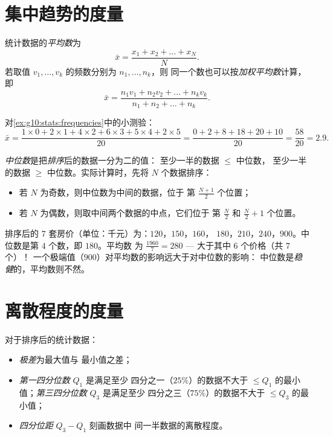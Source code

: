 \section{集中趋势的度量}

\begin{definition}[平均数]\label{def:g10:stats:mean}
统计数据的\emph{平均数}为
\[
\bar x = \frac{x_1 + x_2 + \dots + x_N}{N}.
\]
若取值 $v_1, \dots, v_k$ 的频数分别为 $n_1, \dots, n_k$，则
同一个数也可以按\emph{加权平均数}计算，即
\[
\bar x = \frac{n_1 v_1 + n_2 v_2 + \dots + n_k v_k}{n_1 + n_2 + \dots + n_k}.
\]
\end{definition}

\begin{example}\label{ex:g10:stats:mean}
对\cref{ex:g10:stats:frequencies}中的小测验：
\[
\bar x = \frac{1 \times 0 + 2 \times 1 + 4 \times 2 + 6 \times 3
+ 5 \times 4 + 2 \times 5}{20}
= \frac{0 + 2 + 8 + 18 + 20 + 10}{20}
= \frac{58}{20} = 2.9 .
\]
\end{example}

\begin{definition}[中位数]\label{def:g10:stats:median}
\emph{中位数}是把\emph{排序}后的数据一分为二的值：
至少一半的数据 $\leq$ 中位数，
至少一半的数据 $\geq$ 中位数。实际计算时，先将 $N$ 个数据排序：
\begin{itemize}
  \item 若 $N$ 为奇数，则中位数为中间的数据，位于
        第 $\frac{N+1}{2}$ 个位置；
  \item 若 $N$ 为偶数，则取中间两个数据的中点，它们位于
        第 $\frac N2$ 和 $\frac N2 + 1$ 个位置。
\end{itemize}
\end{definition}

\begin{example}\label{ex:g10:stats:median}
排序后的 $7$ 套房价（单位：千元）为：$120$，$150$，$160$，
$180$，$210$，$240$，$900$。中位数是第 $4$ 个数，即 $180$。平均数
为 $\frac{1960}{7} = 280$ --- 大于其中 $6$ 个价格（共 $7$ 个）！
一个极端值（$900$）对平均数的影响远大于对中位数的影响：
中位数是\emph{稳健}的，平均数则不然。
\end{example}

\section{离散程度的度量}

\begin{definition}[极差、四分位数]\label{def:g10:stats:quartiles}
对于排序后的统计数据：
\begin{itemize}
  \item \emph{极差}为最大值与
        最小值之差；
  \item \emph{第一四分位数} $Q_1$ 是满足至少
        四分之一（$25\%$）的数据不大于
        $\leq Q_1$ 的最小值；\emph{第三四分位数} $Q_3$ 是满足至少
        四分之三（$75\%$）的数据不大于
        $\leq Q_3$ 的最小值；
  \item \emph{四分位距} $Q_3 - Q_1$ 刻画数据中
        间一半数据的离散程度。
\end{itemize}
\end{definition}

